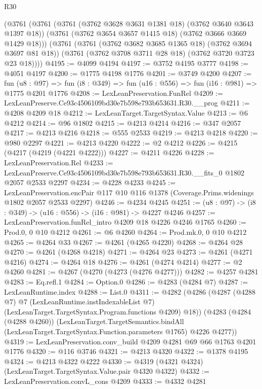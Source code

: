 \begin{lexlean}{R30}
\begin{coremodule}
    (@3761
      (@3761
        (@3761 (@3762 @3628 @3631 @1381 @18) (@3762 @3640 @3643 @1397 @18))
        (@3761 (@3762 @3654 @3657 @1415 @18) (@3762 @3666 @3669 @1429 @18)))
      (@3761
        (@3761 (@3762 @3682 @3685 @1365 @18) (@3762 @3694 @3697 @81 @18))
        (@3761 (@3762 @3708 @3711 @28 @18) (@3762 @3720 @3723 @23 @18))))
@4195 := @4099 @4194
@4197 := @3752 @4195 @3777
@4198 := @4051 @4197
@4200 := @1775 @4198 @1776
@4201 := @3749 @4200
@4207 := fun (u8 : @97) =>
  fun (i8 : @349) => fun (u16 : @556) => fun (i16 : @981) => @1775 @4201 @1776
@4208 := LexLeanPreservation.FunRel
@4209 := LexLeanPreserve.Ce93c4506109bd30e7b598e793b653631.R30.__prog
@4211 := @4208 @4209 @18
@4212 := LexLeanTarget.TargetSyntax.Value
@4213 := @6 @4212
@4214 := @96 @1802
@4215 := @4213 @4214
@4216 := @347 @2057
@4217 := @4213 @4216
@4218 := @555 @2533
@4219 := @4213 @4218
@4220 := @980 @2297
@4221 := @4213 @4220
@4222 := @2 @4212
@4226 := @4215 (@4217 (@4219 (@4221 @4222)))
@4227 := @4211 @4226
@4228 := LexLeanPreservation.Rel
@4233 := LexLeanPreserve.Ce93c4506109bd30e7b598e793b653631.R30.__fits_0 @1802 @2057 @2533 @2297
@4234 := @4228 @4233
@4245 := LexLeanPreservation.encPair
    @117
    @10
    @116
    @1378
    (Coverage.Prims.widenings @1802 @2057 @2533 @2297)
@4246 := @4234 @4245
@4251 := (u8 : @97) -> (i8 : @349) -> (u16 : @556) -> (i16 : @981) -> @4227 @4246
@4257 := LexLeanPreservation.funRel_intro @4209 @18 @4226 @4246 @1765
@4260 := Prod.{0, 0} @10 @4212
@4261 := @6 @4260
@4264 := Prod.mk.{0, 0} @10 @4212
@4265 := @4264 @33
@4267 := @4261 (@4265 @4220)
@4268 := @4264 @28
@4270 := @4261 (@4268 @4218)
@4271 := @4264 @23
@4273 := @4261 (@4271 @4216)
@4274 := @4264 @18
@4276 := @4261 (@4274 @4214)
@4277 := @2 @4260
@4281 := @4267 (@4270 (@4273 (@4276 @4277)))
@4282 := @4257 @4281
@4283 := Eq.refl.{1}
@4284 := Option.{0}
@4286 := @4283 (@4284 @7)
@4287 := LexLeanRuntime.index
@4288 := List.{0}
@4311 := @4282
    (@4286
      (@4287
        (@4288 @7)
        @7
        (LexLeanRuntime.instIndexableList @7)
        (LexLeanTarget.TargetSyntax.Program.functions @4209)
        @18))
    (@4283
      (@4284 (@4288 @4260))
      (LexLeanTarget.TargetSemantics.bindAll
        (LexLeanTarget.TargetSyntax.Function.parameters @1765)
        @4226
        @4277))
@4319 := LexLeanPreservation.conv_build @4209 @4281 @69 @66 @1763 @4201 @1776
@4320 := @116 @3746
@4321 := @4213 @4320
@4322 := @1378 @4195
@4324 := @4213 @4322 @4222
@4330 := @4319 (@4321 @4324) (LexLeanTarget.TargetSyntax.Value.pair @4320 @4322)
@4332 := LexLeanPreservation.convL_cons @4209
@4333 := @4332 @4281

\end{coremodule}
\end{lexlean}
